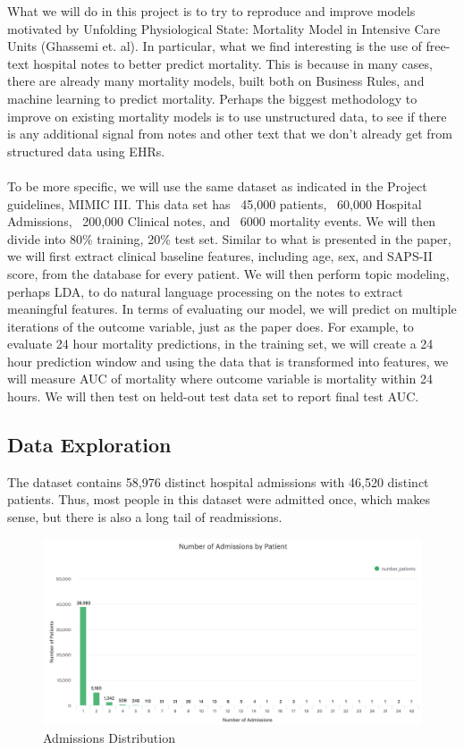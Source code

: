 \documentclass[12pt, final]{article}
\begin{document}
What we will do in this project is to try to reproduce and improve models motivated by Unfolding Physiological State: Mortality Model in Intensive Care Units (Ghassemi et. al). In particular, what we find interesting is the use of free-text hospital notes to better predict mortality. This is because in many cases, there are already many mortality models, built both on Business Rules, and machine learning to predict mortality. Perhaps the biggest methodology to improve on existing mortality models is to use unstructured data, to see if there is any additional signal from notes and other text that we don't already get from structured data using EHRs.
\\
\\
To be more specific, we will use the same dataset as indicated in the Project guidelines, MIMIC III. This data set has ~45,000 patients, ~60,000 Hospital Admissions, ~200,000 Clinical notes, and ~6000 mortality events. We will then divide into 80\% training, 20\% test set. Similar to what is presented in the paper, we will first extract clinical baseline features, including age, sex, and SAPS-II score, from the database for every patient. We will then perform topic modeling, perhaps LDA, to do natural language processing on the notes to extract meaningful features. In terms of evaluating our model, we will predict on multiple iterations of the outcome variable, just as the paper does. For example, to evaluate 24 hour mortality predictions, in the training set, we will create a 24 hour prediction window and using the data that is transformed into features, we will measure AUC of mortality where outcome variable is mortality within 24 hours. We will then test on held-out test data set to report final test AUC.

\subsection{Data Exploration}
The dataset contains 58,976 distinct hospital admissions with 46,520 distinct patients. Thus, most people in this dataset were admitted once, which makes sense, but there is also a long tail of readmissions.

\begin{figure}[H]
\centering
\caption{Admissions Distribution}
\label{AdmissionsDistribution}
\includegraphics[page = {1}, scale = 0.4]{./images/admissions-distribution.png}
\end{figure}
\end{document}
